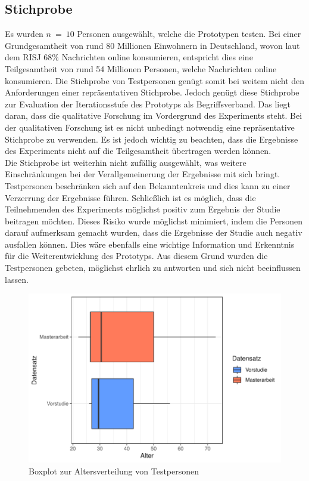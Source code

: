 \subsection{Stichprobe}
Es wurden $n\ =\ 10$ Personen ausgewählt, welche die Prototypen testen.
Bei einer Grundgesamtheit von rund 80 Millionen Einwohnern in Deutschland, wovon laut dem \ac{RISJ} $68\%$ Nachrichten online konsumieren, entspricht dies eine Teilgesamtheit von rund 54 Millionen Personen, welche Nachrichten online konsumieren.
Die Stichprobe von Testpersonen genügt somit bei weitem nicht den Anforderungen einer repräsentativen Stichprobe.
Jedoch genügt diese Stichprobe zur Evaluation der Iterationsstufe des Prototyps als Begriffsverband.
Das liegt daran, dass die qualitative Forschung im Vordergrund des Experiments steht.
Bei der qualitativen Forschung ist es nicht unbedingt notwendig eine repräsentative Stichprobe zu verwenden.
Es ist jedoch wichtig zu beachten, dass die Ergebnisse des Experiments nicht auf die Teilgesamtheit übertragen werden können.\\

Die Stichprobe ist weiterhin nicht zufällig ausgewählt, was weitere Einschränkungen bei der Verallgemeinerung der Ergebnisse mit sich bringt.
Testpersonen beschränken sich auf den Bekanntenkreis und dies kann zu einer Verzerrung der Ergebnisse führen.
Schließlich ist es möglich, dass die Teilnehmenden des Experiments möglichst positiv zum Ergebnis der Studie beitragen möchten.
Dieses Risiko wurde möglichst minimiert, indem die Personen darauf aufmerksam gemacht wurden, dass die Ergebnisse der Studie auch negativ ausfallen können.
Dies wäre ebenfalls eine wichtige Information und Erkenntnis für die Weiterentwicklung des Prototyps.
Aus diesem Grund wurden die Testpersonen gebeten, möglichst ehrlich zu antworten und sich nicht beeinflussen lassen.\\

\begin{figure}[!ht]
    \centering
    \includegraphics[width=1\columnwidth]{figures/boxplot.pdf}
    \caption{\label{fig:age-boxplot}Boxplot zur Altersverteilung von Testpersonen}
\end{figure}

